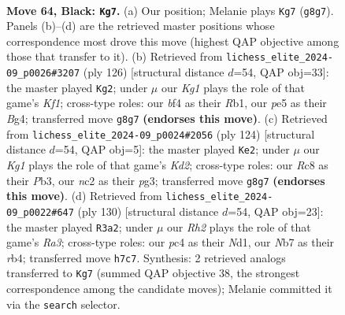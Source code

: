 \documentclass[11pt]{article}
\begin{document}
\clearpage

\begin{figure}[p]\centering
\begin{subfigure}{0.46\textwidth}\centering
\resizebox{\linewidth}{!}{%
\newchessgame
\chessboard[
  setfen={2r3k1/pn5r/1p2p3/4P2p/2P2B2/3K2PR/P1N2R2/8 b - - 0 64},
  showmover=false,
  pgfstyle=straightmove, color=movearrow, markmove={g8-g7}
]}
\caption{}
\end{subfigure}\hfill
\begin{subfigure}{0.46\textwidth}\centering
\resizebox{\linewidth}{!}{%
\newchessgame
\chessboard[
  setfen={5r2/6pk/6p1/1P1nr3/4p1B1/4P3/5P1P/1RR2K2 w - - 25 64},
  showmover=false,
  pgfstyle=straightmove, color=movearrow, markmove={f1-g2}
]}
\caption{}
\end{subfigure}
\\[4pt]
\begin{subfigure}{0.46\textwidth}\centering
\resizebox{\linewidth}{!}{%
\newchessgame
\chessboard[
  setfen={4r3/1ppN4/8/p1P3P1/3Rbk1P/PP4p1/3K4/8 w - - 0 63},
  showmover=false,
  pgfstyle=straightmove, color=movearrow, markmove={d2-e2}
]}
\caption{}
\end{subfigure}\hfill
\begin{subfigure}{0.46\textwidth}\centering
\resizebox{\linewidth}{!}{%
\newchessgame
\chessboard[
  setfen={r7/P7/1kp3p1/5bP1/1r5p/R7/5P1K/R2N4 w - - 10 66},
  showmover=false,
  pgfstyle=straightmove, color=movearrow, markmove={a3-a2}
]}
\caption{}
\end{subfigure}
\caption{\textbf{Move 64, Black: \texttt{Kg7}.} (a) Our position; Melanie plays \texttt{Kg7} (\texttt{g8g7}). Panels (b)--(d) are the retrieved master positions whose correspondence most drove this move (highest QAP objective among those that transfer to it). (b) Retrieved from \texttt{lichess\_elite\_2024-09\_p0026\#3207} (ply 126) [structural distance $d$=54, QAP obj=33]: the master played \texttt{Kg2}; under $\mu$ our \emph{Kg1} plays the role of that game's \emph{Kf1}; cross-type roles: our \emph{b}f4 as their \emph{R}b1, our \emph{p}e5 as their \emph{B}g4; transferred move \texttt{g8g7} \textbf{(endorses this move)}. (c) Retrieved from \texttt{lichess\_elite\_2024-09\_p0024\#2056} (ply 124) [structural distance $d$=54, QAP obj=5]: the master played \texttt{Ke2}; under $\mu$ our \emph{Kg1} plays the role of that game's \emph{Kd2}; cross-type roles: our \emph{R}c8 as their \emph{P}b3, our \emph{n}c2 as their \emph{p}g3; transferred move \texttt{g8g7} \textbf{(endorses this move)}. (d) Retrieved from \texttt{lichess\_elite\_2024-09\_p0022\#647} (ply 130) [structural distance $d$=54, QAP obj=23]: the master played \texttt{R3a2}; under $\mu$ our \emph{Rh2} plays the role of that game's \emph{Ra3}; cross-type roles: our \emph{p}c4 as their \emph{N}d1, our \emph{N}b7 as their \emph{r}b4; transferred move \texttt{h7c7}. Synthesis: 2 retrieved analogs transferred to \texttt{Kg7} (summed QAP objective 38, the strongest correspondence among the candidate moves); Melanie committed it via the \texttt{search} selector.}
\label{fig:thought-m127}
\end{figure}
\end{document}
